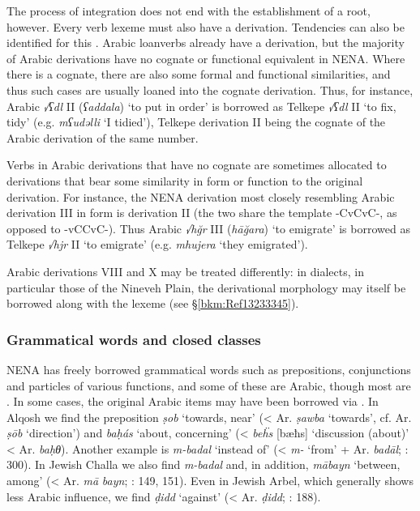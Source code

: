 \documentclass[output=paper]{langsci/langscibook}
\begin{document}
The process of integration does not end with the establishment of a {root}, however. Every verb lexeme must also have a {derivation}. Tendencies can also be identified for this \citep{Coghill2015}. Arabic loanverbs already have a {derivation}, but the majority of Arabic derivations have no {cognate} or functional equivalent in NENA. Where there is a {cognate}, there are also some formal and functional similarities, and thus such cases are usually loaned into the {cognate} {derivation}. Thus, for instance, Arabic \textit{√ʕdl} II (\textit{ʕaddala}) ‘to put in order’ is borrowed as  Telkepe \textit{√ʕdl} II ‘to fix, tidy’ (e.g. \textit{mʕudəlli} ‘I tidied’), Telkepe {derivation} II being the {cognate} of the Arabic {derivation} of the same number.

Verbs in Arabic derivations that have no {cognate} are sometimes allocated to derivations that bear some similarity in form or function to the original {derivation}. For instance, the NENA {derivation} most closely resembling Arabic {derivation} III in form is {derivation} II (the two share the template -CvCvC-, as opposed to -vCCvC-). Thus Arabic \textit{√hğr} III (\textit{hāğara}) ‘to emigrate’ is borrowed as  Telkepe \textit{√hjr} II ‘to emigrate’ (e.g. \textit{mhujera} ‘they emigrated’).

Arabic derivations VIII and X may be treated differently: in   dialects, in particular those of the Nineveh Plain, the {derivational} morphology may itself be borrowed along with the lexeme (see §\ref{bkm:Ref13233345}).

\subsubsection{Grammatical words and closed classes}\label{closedclass}

NENA has freely borrowed grammatical words such as {prepositions}, conjunctions and particles of various functions, and some of these are Arabic, though most are . In some cases, the original Arabic items may have been borrowed via . In  Alqosh we find the {preposition} \textit{ṣob} ‘towards, near’ (< Ar. \textit{ṣawba} ‘towards’, cf.  Ar. \textit{ṣōb} ‘direction’) and \textit{baḥás} ‘about, concerning’ (<  \textit{be\"{h}s} [bæħs] ‘discussion (about)’ < Ar. \textit{baḥθ}). Another example is \textit{m-badal} ‘instead of’ (< \textit{m-} ‘from’ +  Ar. \textit{badāl}; \citealt{Coghill2004}: 300). In Jewish Challa we also find \textit{m-badal} and, in addition, \textit{mābayn} ‘between, among’ (< Ar. \textit{mā} \textit{bayn}; \citealt{Fassberg2010}: 149, 151). Even in Jewish Arbel, which generally shows less Arabic influence, we find \textit{ḍidd} ‘against’ (< Ar. \textit{ḍidd}; \citealt{Khan1999}: 188).
\end{document}
